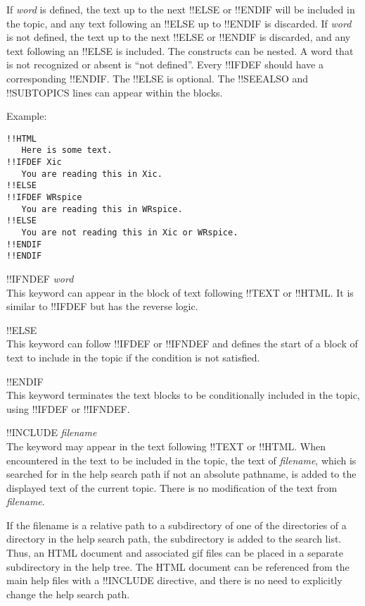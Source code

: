 \begin{description}
If {\it word} is defined, the text up to the next {\vt !!ELSE} or {\vt
!!ENDIF} will be included in the topic, and any text following an {\vt
!!ELSE} up to {\vt !!ENDIF} is discarded.  If {\it word} is not
defined, the text up to the next {\vt !!ELSE} or {\vt !!ENDIF} is
discarded, and any text following an {\vt !!ELSE} is included.  The
constructs can be nested.  A word that is not recognized or absent is
``not defined''.  Every {\vt !!IFDEF} should have a corresponding {\vt
!!ENDIF}.  The {\vt !!ELSE} is optional.  The {\vt !!SEEALSO} and {\vt
!!SUBTOPICS} lines can appear within the blocks.

Example:
\begin{verbatim}
!!HTML
   Here is some text.
!!IFDEF Xic
   You are reading this in Xic.
!!ELSE
!!IFDEF WRspice
   You are reading this in WRspice.
!!ELSE
   You are not reading this in Xic or WRspice.
!!ENDIF
!!ENDIF
\end{verbatim}

\item{\vt !!IFNDEF {\it word}}\\
This keyword can appear in the block of text following {\vt !!TEXT} or
{\vt !!HTML}.  It is similar to {\vt !!IFDEF} but has the reverse
logic.

\item{\vt !!ELSE}\\
This keyword can follow {\vt !!IFDEF} or {\vt !!IFNDEF} and defines
the start of a block of text to include in the topic if the condition
is not satisfied.

\item{\vt !!ENDIF}\\
This keyword terminates the text blocks to be conditionally included
in the topic, using {\vt !!IFDEF} or {\vt !!IFNDEF}.

\item{\vt !!INCLUDE {\it filename}}\\
The keyword may appear in the text following {\vt !!TEXT} or {\vt
!!HTML}.  When encountered in the text to be included in the topic,
the text of {\it filename}, which is searched for in the help search
path if not an absolute pathname, is added to the displayed text of
the current topic.  There is no modification of the text from {\it
filename}.

If the filename is a relative path to a subdirectory of one of the
directories of a directory in the help search path, the subdirectory
is added to the search list.  Thus, an HTML document and associated
gif files can be placed in a separate subdirectory in the help tree.
The HTML document can be referenced from the main help files with a
{\vt !!INCLUDE} directive, and there is no need to explicitly change
the help search path.


\end{description}
